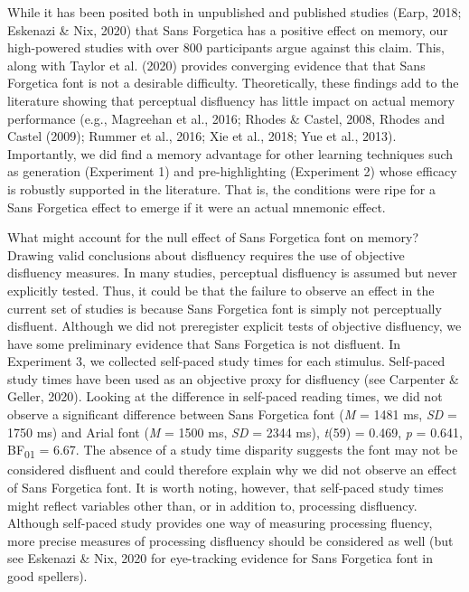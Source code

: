 \documentclass[jou]{apa6}
\begin{document}
While it has been posited both in unpublished and published studies (Earp, 2018; Eskenazi \& Nix, 2020) that Sans Forgetica has a positive effect on memory, our high-powered studies with over 800 participants argue against this claim. This, along with Taylor et al. (2020) provides converging evidence that that Sans Forgetica font is not a desirable difficulty. Theoretically, these findings add to the literature showing that perceptual disfluency has little impact on actual memory performance (e.g., Magreehan et al., 2016; Rhodes \& Castel, 2008, Rhodes and Castel (2009); Rummer et al., 2016; Xie et al., 2018; Yue et al., 2013). Importantly, we did find a memory advantage for other learning techniques such as generation (Experiment 1) and pre-highlighting (Experiment 2) whose efficacy is robustly supported in the literature. That is, the conditions were ripe for a Sans Forgetica effect to emerge if it were an actual mnemonic effect.

What might account for the null effect of Sans Forgetica font on memory? Drawing valid conclusions about disfluency requires the use of objective disfluency measures. In many studies, perceptual disfluency is assumed but never explicitly tested. Thus, it could be that the failure to observe an effect in the current set of studies is because Sans Forgetica font is simply not perceptually disfluent. Although we did not preregister explicit tests of objective disfluency, we have some preliminary evidence that Sans Forgetica is not disfluent. In Experiment 3, we collected self-paced study times for each stimulus. Self-paced study times have been used as an objective proxy for disfluency (see Carpenter \& Geller, 2020). Looking at the difference in self-paced reading times, we did not observe a significant difference between Sans Forgetica font (\emph{M} = 1481 ms, \emph{SD} = 1750 ms) and Arial font (\emph{M} = 1500 ms, \emph{SD} = 2344 ms), \emph{t}(59) = 0.469, \emph{p} = 0.641, BF\textsubscript{01} = 6.67. The absence of a study time disparity suggests the font may not be considered disfluent and could therefore explain why we did not observe an effect of Sans Forgetica font. It is worth noting, however, that self-paced study times might reflect variables other than, or in addition to, processing disfluency. Although self-paced study provides one way of measuring processing fluency, more precise measures of processing disfluency should be considered as well (but see Eskenazi \& Nix, 2020 for eye-tracking evidence for Sans Forgetica font in good spellers).
\end{document}
